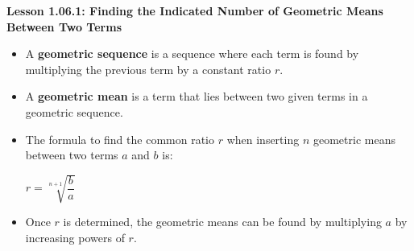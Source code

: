 \begin{center}
\textbf{Lesson 1.06.1: Finding the Indicated Number of Geometric Means Between Two Terms}
\end{center}

\vspace*{-1.5ex}

\begin{itemize}
    \item A \textbf{geometric sequence} is a sequence where each term is found by multiplying the previous term by a constant ratio \( r \).
    \item A \textbf{geometric mean} is a term that lies between two given terms in a geometric sequence.
    \item The formula to find the common ratio \( r \) when inserting \( n \) geometric means between two terms \( a \) and \( b \) is:
      
{\fontsize{11}{13}\selectfont
{\centering $  r = \sqrt[ n+1]{\dfrac{b}{a}}  $\par}
}
    \item Once \( r \) is determined, the geometric means can be found by multiplying \( a \) by increasing powers of \( r \).
\end{itemize}


